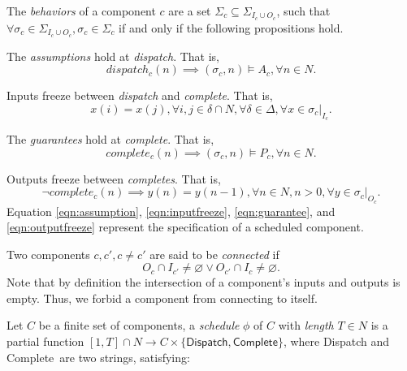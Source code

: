 The \emph{behaviors} of a component $c$ are a set $\Sigma_c \subseteq \Sigma_{I_c \cup O_c}$, such that $\forall \sigma_c \in \Sigma_{I_c \cup O_c}, \sigma_c \in \Sigma_c $ if and only if the following propositions hold.

The \emph{assumptions} hold at \emph{dispatch}. That is,
\begin{equation} 
\label{eqn:assumption}
	dispatch_c(n) \implies (\sigma_c, n) \models A_c, \forall n\in N.
\end{equation}

Inputs freeze between \emph{dispatch} and \emph{complete}. That is,
\begin{equation} 
\label{eqn:inputfreeze}
	x(i) = x(j), \forall i,j\in \delta \cap N, \forall \delta \in \Delta, \forall x \in \sigma_c|_{I_c}.
\end{equation}

The \emph{guarantees} hold at \emph{complete}. That is,
\begin{equation} 
\label{eqn:guarantee}
	complete_c(n) \implies (\sigma_c, n) \models P_c, \forall n\in N.
\end{equation}

Outputs freeze between \emph{completes}. That is,
\begin{equation} 
\label{eqn:outputfreeze}
	\lnot complete_c(n) \implies y(n) = y(n-1), \forall n \in N, n > 0, \forall y \in \sigma_c|_{O_c}.
\end{equation}
Equation \ref{eqn:assumption}, \ref{eqn:inputfreeze}, \ref{eqn:guarantee}, and \ref{eqn:outputfreeze} represent the specification of a scheduled component.

Two components $ c, c', c\neq c'$ are said to be \emph{connected} if
\begin{equation*}
	O_c \cap I_{c'} \neq \varnothing \vee O_{c'} \cap I_c \neq \varnothing.
\end{equation*}
Note that by definition the intersection of a component's inputs and outputs is empty. Thus, we forbid a component from connecting to itself.

Let $C$ be a finite set of components, a \emph{schedule} $\phi$ of $C$ with \emph{length} $T\in N$ is a partial function $[1, T]  \cap N\rightarrow C\times \{\textsf{Dispatch}, \textsf{Complete}\}$, where \textsf{Dispatch} and \textsf{Complete}\ are two strings, satisfying:

